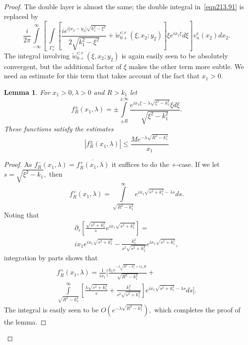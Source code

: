 \documentclass[10pt,a4paper]{amsart}
\newtheorem{lemma}{Lemma}
\newcommand\pa{\partial}
\newcommand\tw{\tilde w_{0+}}
\begin{document}
\begin{proof}
   The double layer is almost the same; the double integral in~\eqref{eqn213.91} is
   replaced by
     \begin{equation}\label{eqn218.93}
    \frac{i}{2\pi}
    \int\limits_{-\infty}^{\infty}\left[\,\int\limits_{\Gamma_{\nu}^+}
    \left[\frac{ie^{i|x_2-y_2|\sqrt{k_1^2-\xi^2}}}{2\sqrt{k_1^2-\xi^2}}+
       \tw^{c;r}(\xi,x_2;y_2)\right]\xi e^{ix_1\xi}d\xi\right] v_n^{r}(x_2)dx_2.
     \end{equation}
     The integral involving $\tw^{c;r}(\xi,x_2;y_2)$ is again easily seen to be
     absolutely convergent, but the additional factor of $\xi$ makes the other
     term more subtle. We need an estimate for this term that takes account of
     the fact that $x_1>0.$
     \begin{lemma}
       For $x_1>0, \lambda>0$ and $R>k_1$ let
       \begin{equation}
       f^{\pm}_R(x_1,\lambda)=\pm\int\limits_{\pm R}^{\pm \infty}
       \frac{e^{ix_1\xi-\lambda\sqrt{\xi^2-k_1^2}}\xi d\xi}{\sqrt{\xi^2-k_1^2}}.
       \end{equation}
       These functions satisfy the estimates
       \begin{equation}
         |f^{\pm}_R(x_1,\lambda)|\leq \frac{Me^{-\lambda\sqrt{R^2-k_1^2}}}{x_1}
       \end{equation}
     \end{lemma}
     \begin{proof}
       As $f^-_R(x_1,\lambda)=\overline{f^+_R(x_1,\lambda)}$ it suffices to do the $+$-case.
       If we let $s=\sqrt{\xi^2-k_1},$ then
       \begin{equation}
         f^+_R(x_1,\lambda)=\int\limits_{\sqrt{R^2-k_1^2}}^{\infty}e^{ix_1\sqrt{s^2+k_1^2}-\lambda s}ds.
       \end{equation}
       Noting that
       \begin{multline}\label{eqn222.93}
         \pa_s\left[\frac{\sqrt{s^2+k_1^2}}{s}e^{ix_1\sqrt{s^2+k_1^2}}\right]=\\
         ix_1e^{ix_1\sqrt{s^2+k_1^2}}-\frac{k_1^2}{s^2\sqrt{s^2+k_1^2}}e^{ix_1\sqrt{s^2+k_1^2}},
       \end{multline}
       integration by parts shows that
       \begin{multline}
         f^+_R(x_1,\lambda)=
         \frac{1}{ix_1}\Bigg[
           \frac{k_1e^{-\lambda\sqrt{R^2-k_1^2}+ix_1R}}{\sqrt{R^2-k_1^2}}
           +\\
           \int\limits_{\sqrt{R^2-k_1^2}}^{\infty}\left[\frac{\lambda\sqrt{s^2+k_1^2}}{s}+
             \frac{k_1^2}{s^2\sqrt{s^2+k_1^2}}\right]e^{ix_1\sqrt{s^2+k_1^2}-\lambda
             s}ds\Bigg].
       \end{multline}
      The integral is easily seen to be $O(e^{-\lambda\sqrt{R^2-k_1^2}}),$ which
      completes the proof of the lemma.
     \end{proof}


\end{proof}
\end{document}
